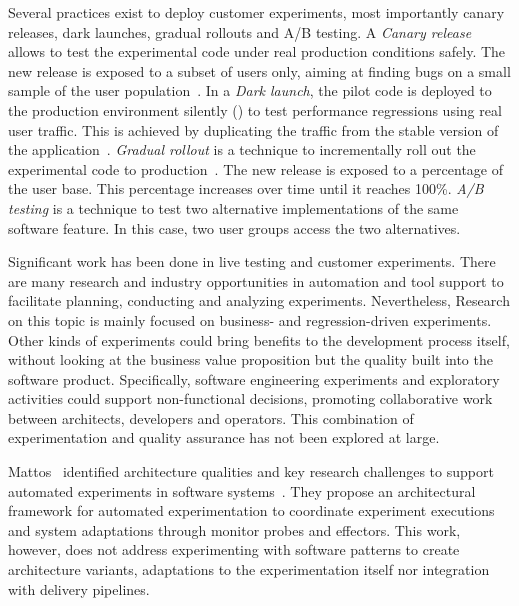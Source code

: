 Several practices exist to deploy customer experiments, most importantly canary releases, dark launches, gradual rollouts and A/B testing. A \emph{Canary release} allows to test the experimental code under real production conditions safely. The new release is exposed to a subset of users only, aiming at finding bugs on a small sample of the user population~\cite{humble-2010-continuous}. In a \emph{Dark launch}, the pilot code is deployed to the production environment silently () to test performance regressions using real user traffic. This is achieved by duplicating the traffic from the stable version of the application~\cite{schermann-2016-bifrost}. \emph{Gradual rollout} is a technique to incrementally roll out the experimental code to production~\cite{humble-2010-continuous}. The new release is exposed to a percentage of the user base. This percentage increases over time until it reaches 100\%. \emph{A/B testing} is a technique to test two alternative implementations of the same software feature. In this case, two user groups access the two alternatives.

Significant work has been done in live testing and customer experiments. There are many research and industry opportunities in automation and tool support to facilitate planning, conducting and analyzing experiments. Nevertheless, Research on this topic is mainly focused on business- and regression-driven experiments. Other kinds of experiments could bring benefits to the development process itself, without looking at the business value proposition but the quality built into the software product. Specifically, software engineering experiments and exploratory activities could support non-functional decisions, promoting collaborative work between architects, developers and operators. This combination of experimentation and quality assurance has not been explored at large.

Mattos~\etal{} identified architecture qualities and key research challenges to support automated experiments in software systems~\cite{mattos-2017-towards}. They propose an architectural framework for automated experimentation to coordinate experiment executions and system adaptations through monitor probes and effectors. This work, however, does not address experimenting with software patterns to create architecture variants, adaptations to the experimentation itself nor integration with delivery pipelines.

